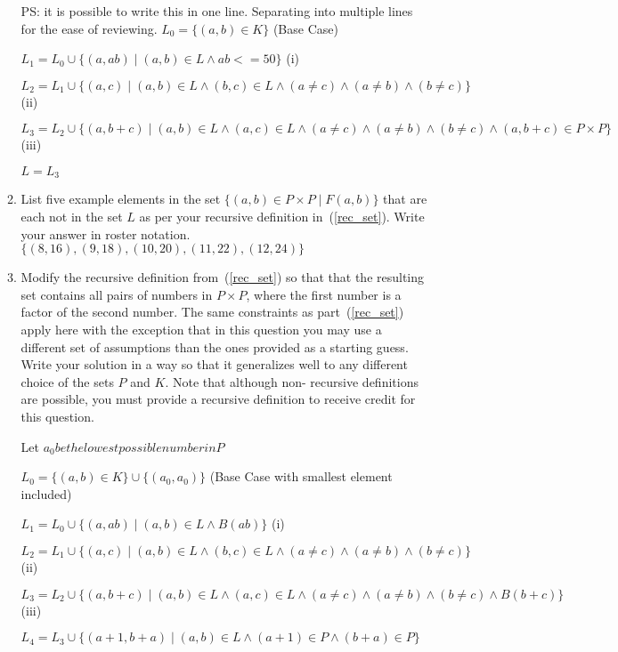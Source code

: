 \documentclass[12pt, oneside]{article}
\begin{document}
\begin{enumerate}
\begin{enumerate}
PS: it is possible to write this in one line. Separating into multiple lines for the ease of reviewing.
$L_0 = \{(a, b) \in K\}$ (Base Case)

$L_1 = L_0 \cup \{(a, ab) \mid (a, b) \in L \land ab <= 50\}$ (i)

$L_2 = L_1 \cup \{(a, c) \mid (a, b) \in L \land (b, c) \in L \land (a \neq c) \land (a \neq b) \land (b \neq c)\}$ (ii)

$L_3 = L_2 \cup \{(a, b + c) \mid (a, b) \in L \land (a, c) \in L \land (a \neq c) \land (a \neq b) \land (b \neq c) \land (a, b+c) \in P \times P\}$ (iii)

$L = L_3$

\item List five example elements in the set $\{(a,b) \in P\times P
\mid F(a,b)\}$ that are each not in the set $L$ as per your
recursive definition in~(\ref{rec_set}). Write your answer in
roster notation.
\newline $\{(8, 16), (9, 18), (10, 20), (11, 22), (12, 24)\}$

\item Modify the recursive definition from~(\ref{rec_set}) so that
that the resulting set contains all pairs of numbers in $P \times P$, where the first number is a factor of the second number.
The same constraints as part~(\ref{rec_set}) apply here with the
exception that in this question you may use a different set of
assumptions than the ones provided as a starting guess. Write
your solution in a way so that it generalizes well to any
different choice of the sets $P$ and $K$. Note that although non-
recursive definitions are possible, you must provide a recursive
definition to receive credit for this question.

Let $a_0 be the lowest possible number in P$

$L_0 = \{(a, b) \in K\} \cup \{(a_0, a_0)\}$ (Base Case with smallest element included)

$L_1 = L_0 \cup \{(a, ab) \mid (a, b) \in L \land B(ab)\}$ (i)

$L_2 = L_1 \cup \{(a, c) \mid (a, b) \in L \land (b, c) \in L \land (a \neq c) \land (a \neq b) \land (b \neq c)\}$ (ii)

$L_3 = L_2 \cup \{(a, b + c) \mid (a, b) \in L \land (a, c) \in L \land (a \neq c) \land (a \neq b) \land (b \neq c) \land B(b+c)\}$ (iii)

$L_4 = L_3 \cup \{(a + 1, b + a) \mid (a, b) \in L \land (a+1) \in P \land (b + a) \in P\}$


\end{enumerate}
\end{enumerate}
\end{document}
